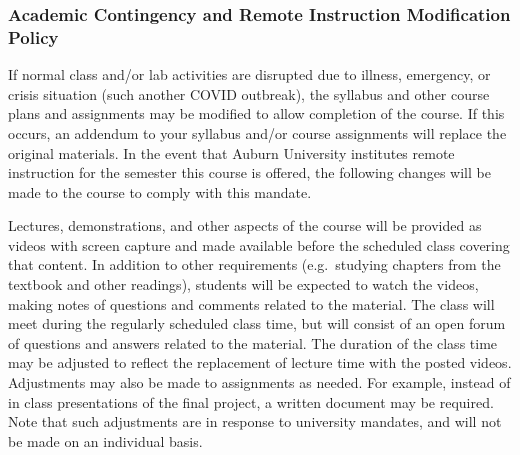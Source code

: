 \documentclass[11pt,]{article}
\begin{document}
\hypertarget{academic-contingency-and-remote-instruction-modification-policy}{%
\subsubsection{Academic Contingency and Remote Instruction Modification
Policy}\label{academic-contingency-and-remote-instruction-modification-policy}}

If normal class and/or lab activities are disrupted due to illness,
emergency, or crisis situation (such another COVID outbreak), the
syllabus and other course plans and assignments may be modified to allow
completion of the course. If this occurs, an addendum to your syllabus
and/or course assignments will replace the original materials. In the
event that Auburn University institutes remote instruction for the
semester this course is offered, the following changes will be made to
the course to comply with this mandate.

Lectures, demonstrations, and other aspects of the course will be
provided as videos with screen capture and made available before the
scheduled class covering that content. In addition to other requirements
(e.g.~studying chapters from the textbook and other readings), students
will be expected to watch the videos, making notes of questions and
comments related to the material. The class will meet during the
regularly scheduled class time, but will consist of an open forum of
questions and answers related to the material. The duration of the class
time may be adjusted to reflect the replacement of lecture time with the
posted videos. Adjustments may also be made to assignments as needed.
For example, instead of in class presentations of the final project, a
written document may be required. Note that such adjustments are in
response to university mandates, and will not be made on an individual
basis.
\end{document}
